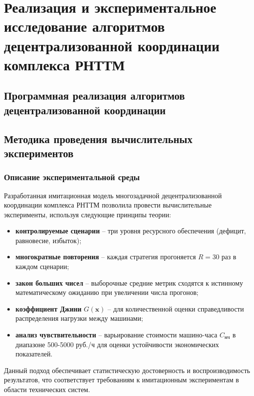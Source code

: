 \chapter{Реализация и экспериментальное исследование алгоритмов децентрализованной координации комплекса РНТТМ}\label{ch:ch3}

\section{Программная реализация алгоритмов децентрализованной координации}\label{sec:ch3/sec1}



\section{Методика проведения вычислительных экспериментов}\label{sec:ch3/sec2}

\subsection{Описание экспериментальной среды}\label{sec:ch3/sec2sub1}

Разработанная имитационная модель многозадачной децентрализованной координации комплекса РНТТМ позволила провести вычислительные эксперименты, используя следующие принципы теории:
\begin{itemize}[beginpenalty=10000, midpenalty=10000, wide=\parindent, leftmargin=0pt]
    \item \textbf{контролируемые сценарии} -- три уровня ресурсного обеспечения (дефицит, равновесие, избыток);
    \item \textbf{многократные повторения} -- каждая стратегия прогоняется \(R = 30\) раз в каждом сценарии;
    \item \textbf{закон больших чисел} -- выборочные средние метрик сходятся к истинному математическому ожиданию при увеличении числа прогонов;
    \item \textbf{коэффициент Джини} \(G(\mathbf{x})\) -- для количественной оценки справедливости распределения нагрузки между машинами;
    \item \textbf{анализ чувствительности} -- варьирование стоимости машино-часа \(C_{\text{мч}}\) в диапазоне 500-5000 руб./ч для оценки устойчивости экономических показателей.
\end{itemize}

Данный подход обеспечивает статистическую достоверность и воспроизводимость результатов, что соответствует требованиям к имитационным экспериментам в области технических систем.

